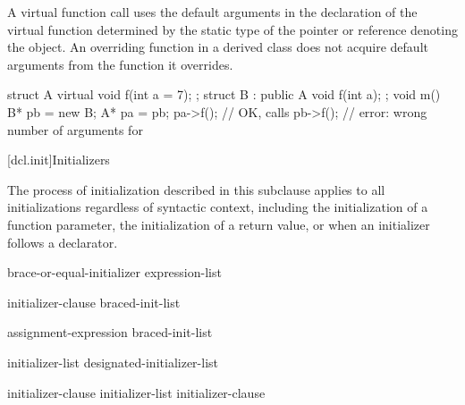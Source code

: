 \pnum
{}%
A virtual function call uses the default
arguments in the declaration of the virtual function determined
by the static type of the pointer or reference denoting the
object.
An overriding function in a derived class does not
acquire default arguments from the function it overrides.
\begin{example}
\begin{codeblock}
struct A {
  virtual void f(int a = 7);
};
struct B : public A {
  void f(int a);
};
void m() {
  B* pb = new B;
  A* pa = pb;
  pa->f();          // OK, calls 
  pb->f();          // error: wrong number of arguments for 
}
\end{codeblock}
\end{example}
%

[dcl.init]{Initializers}%

\pnum
The process of initialization described in this subclause applies to
all initializations regardless of syntactic context, including the
initialization of a function parameter, the
initialization of a return value, or when an
initializer follows a declarator.

\begin{bnf}
\br
    brace-or-equal-initializer\br
    \terminal{(} expression-list \terminal{)}
\end{bnf}

\begin{bnf}
\br
    \terminal{=} initializer-clause\br
    braced-init-list
\end{bnf}

\begin{bnf}
\br
    assignment-expression\br
    braced-init-list
\end{bnf}

\begin{bnf}
\br
    \terminal{\{} initializer-list \opt{\terminal{,}} \terminal{\}}\br
    \terminal{\{} designated-initializer-list \opt{\terminal{,}} \terminal{\}}\br
    \terminal{\{} \terminal{\}}
\end{bnf}

\begin{bnf}
\br
    initializer-clause \br
    initializer-list \terminal{,} initializer-clause 
\end{bnf}

